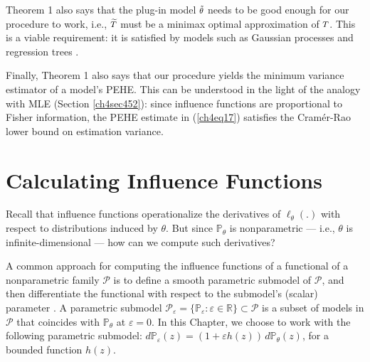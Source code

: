 \documentclass [PhD] {uclathes}
\begin{document}
Theorem 1 also says that the plug-in model $\mbox{\footnotesize $\tilde{\theta}$}$ needs to be good enough for our procedure to work, i.e., $\mbox{\footnotesize $\widetilde{T}$}$ must be a minimax optimal approximation of $\mbox{\footnotesize $T$}$. This is a viable requirement: it is satisfied by models such as Gaussian processes and regression trees \cite{alaa2018limits}.

Finally, Theorem 1 also says that our procedure yields the minimum variance estimator of a model's PEHE. This can be understood in the light of the analogy with MLE (Section \ref{ch4sec452}): since influence functions are proportional to Fisher information, the PEHE estimate in (\ref{ch4eq17}) satisfies the Cram\'er-Rao lower bound on estimation variance. 

\section{Calculating Influence Functions}
\label{ch4sec46} 
Recall that influence functions operationalize the derivatives of \mbox{\footnotesize $\boldsymbol{\ell}_{\theta}(.)$} with respect to distributions induced by \mbox{\footnotesize $\theta$}. But since \mbox{\footnotesize $\mathbb{P}_\theta$} is nonparametric --- i.e., \mbox{\footnotesize $\theta$} is infinite-dimensional --- how can we compute such derivatives? 

A common approach for computing the influence functions of a functional of a nonparametric family \mbox{\footnotesize $\mathcal{P}$} is to define a smooth parametric submodel of \mbox{\footnotesize $\mathcal{P}$}, and then differentiate the functional with respect to the submodel's (scalar) parameter \cite{van2014higher,kennedy2018nonparametric}. A parametric submodel \mbox{\footnotesize $\mathcal{P}_{\varepsilon} = \{\mathbb{P}_{\varepsilon}: \varepsilon \in \mathbb{R}\} \subset \mathcal{P}$} is a subset of models in \mbox{\footnotesize $\mathcal{P}$} that coincides with \mbox{\footnotesize $\mathbb{P}_{\theta}$} at \mbox{\footnotesize $\varepsilon = 0$}. In this Chapter, we choose to work with the following parametric submodel: \mbox{\footnotesize $d\mathbb{P}_{\varepsilon}(z) = (1+\varepsilon h(z))\,d\mathbb{P}_{\theta}(z)$}, for a bounded function \mbox{\footnotesize $h(z)$}. 
\end{document}
